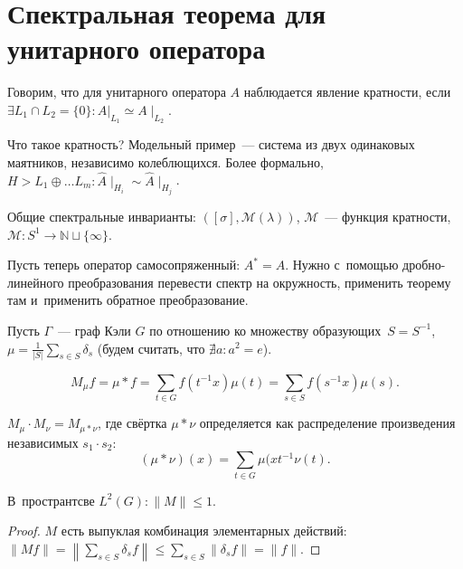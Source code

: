 \documentclass{article}
\begin{document}
\section{Спектральная теорема для унитарного оператора}

\begin{definition}
	Говорим, что для унитарного оператора $A$ наблюдается явление кратности, если $\exists L_1 \cap
	L_2 = \{0\}: A|_{L_1} \simeq A\mid_{L_2}$.
\end{definition}

Что такое кратность? Модельный пример~--- система из двух одинаковых маятников, независимо
колеблющихся. Более формально, $H > L_1 \oplus \ldots L_m: \hat A\mid_{H_i} \sim \hat A\mid_{H_j}$.

Общие спектральные инварианты: $([\sigma], \mathcal{M}(\lambda))$, $\mathcal{M}$~--- функция
кратности, $\mathcal{M}: S^1 \rightarrow \mathbb{N} \sqcup \{\infty\}$.

Пусть теперь оператор самосопряженный: $A^\ast = A$. Нужно с~помощью дробно-линейного преобразования
перевести спектр на окружность, применить теорему там и~применить обратное преобразование.

Пусть $\Gamma$~--- граф Кэли $G$ по отношению ко множеству образующих~$S = S^{-1}$,
$\mu = \frac{1}{|S|} \sum\limits_{s \in S} \delta_s$ (будем считать, что $\nexists a: a^2 = e$).

$$M_\mu f = \mu \ast f = \sum\limits_{t \in G} f(t^{-1} x)\mu(t) = \sum\limits_{s \in S}
f(s^{-1}x)\mu(s).$$

\begin{remark}
	$M_\mu \cdot M_\nu = M_{\mu \ast \nu}$, где свёртка $\mu \ast \nu$ определяется как распределение
	произведения независимых $s_1 \cdot s_2$:
	$$(\mu \ast \nu)(x) = \sum\limits_{t \in G} \mu(xt^{-1} \nu(t).$$
\end{remark}

\begin{lemma}
	В~пространтсве $L^2(G): \|M\| \le 1$.
\end{lemma}
\begin{proof}
	$M$ есть выпуклая комбинация элементарных действий: $\| Mf \| = \left\| \sum\limits_{s \in S}
	\delta_s f\right\| \le \sum\limits_{s \in S} \left\| \delta_s f \right\| = \| f \|$.
\end{proof}
\end{document}
